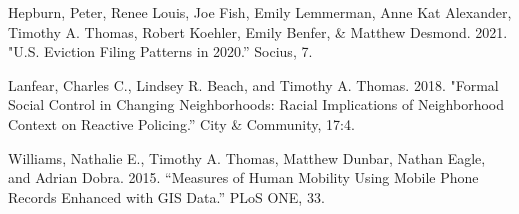 \begin{cvparagraph}

Hepburn, Peter, Renee Louis, Joe Fish, Emily Lemmerman, Anne Kat Alexander,  Timothy A. Thomas, Robert Koehler, Emily Benfer, \& Matthew Desmond. 2021. "U.S. Eviction Filing Patterns in 2020.” Socius, 7.
\end{cvparagraph}

\begin{cvparagraph}

Lanfear, Charles C., Lindsey R. Beach, and Timothy A. Thomas. 2018. "Formal Social Control in Changing Neighborhoods: Racial Implications of Neighborhood Context on Reactive Policing.” City \& Community, 17:4.
\end{cvparagraph}

\begin{cvparagraph}

Williams, Nathalie E., Timothy A. Thomas, Matthew Dunbar, Nathan Eagle, and Adrian Dobra. 2015. “Measures of Human Mobility Using Mobile Phone Records Enhanced
with GIS Data.” PLoS ONE, 33.
\end{cvparagraph}







